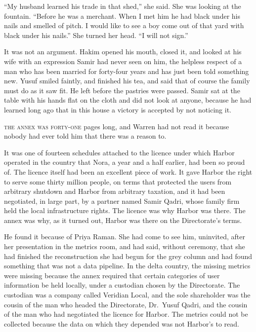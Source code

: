 ``My husband learned his trade in that shed,'' she said. She was looking at the fountain. ``Before he was a merchant. When I met him he had black under his nails and smelled of pitch. I would like to see a boy come out of that yard with black under his nails.'' She turned her head. ``I will not sign.''

It was not an argument. Hakim opened his mouth, closed it, and looked at his wife with an expression Samir had never seen on him, the helpless respect of a man who has been married for forty-four years and has just been told something new. Yusuf smiled faintly, and finished his tea, and said that of course the family must do as it saw fit. He left before the pastries were passed. Samir sat at the table with his hands flat on the cloth and did not look at anyone, because he had learned long ago that in this house a victory is accepted by not noticing it.


\textsc{the annex was forty-one} pages long, and Warren had not read it because nobody had ever told him that there was a reason to.

It was one of fourteen schedules attached to the licence under which Harbor operated in the country that Nora, a year and a half earlier, had been so proud of. The licence itself had been an excellent piece of work. It gave Harbor the right to serve some thirty million people, on terms that protected the users from arbitrary shutdown and Harbor from arbitrary taxation, and it had been negotiated, in large part, by a partner named Samir Qadri, whose family firm held the local infrastructure rights. The licence was why Harbor was there. The annex was why, as it turned out, Harbor was there on the Directorate's terms.

He found it because of Priya Raman. She had come to see him, uninvited, after her presentation in the metrics room, and had said, without ceremony, that she had finished the reconstruction she had begun for the grey column and had found something that was not a data pipeline. In the delta country, the missing metrics were missing because the annex required that certain categories of user information be held locally, under a custodian chosen by the Directorate. The custodian was a company called Veridian Local, and the sole shareholder was the cousin of the man who headed the Directorate, Dr.~Yusuf Qadri, and the cousin of the man who had negotiated the licence for Harbor. The metrics could not be collected because the data on which they depended was not Harbor's to read.

